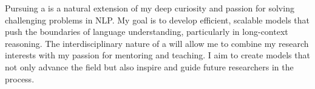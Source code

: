 
Pursuing a \thedegree is a natural extension of my deep curiosity and passion for solving challenging problems in NLP. 
% 
My goal is to develop efficient, scalable models that push the boundaries of language understanding, particularly in long-context reasoning. 
% 
The interdisciplinary nature of a \thedegree will allow me to combine my research interests with my passion for mentoring and teaching.
% 
I aim to create models that not only advance the field but also inspire and guide future researchers in the process.
